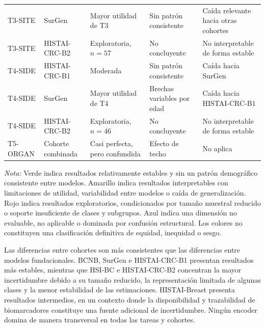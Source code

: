 \begin{table}[htbp]
{\begin{tabular}{l l p{3.2cm} p{3.6cm} p{3.4cm}}
T3-SITE &
SurGen &
\cellcolor{green!20}Mayor utilidad de T3 &
\cellcolor{green!20}Sin patrón consistente &
\cellcolor{yellow!25}Caída relevante hacia otras cohortes \\

T3-SITE &
HISTAI-CRC-B2 &
\cellcolor{red!25}Exploratoria, $n=57$ &
\cellcolor{red!25}No concluyente &
\cellcolor{red!25}No interpretable de forma estable \\
\midrule

T4-SIDE &
HISTAI-CRC-B1 &
\cellcolor{yellow!25}Moderada &
\cellcolor{green!20}Sin patrón consistente &
\cellcolor{yellow!25}Caída hacia SurGen \\

T4-SIDE &
SurGen &
\cellcolor{green!20}Mayor utilidad de T4 &
\cellcolor{yellow!25}Brechas variables por edad &
\cellcolor{yellow!25}Caída hacia HISTAI-CRC-B1 \\

T4-SIDE &
HISTAI-CRC-B2 &
\cellcolor{red!25}Exploratoria, $n=46$ &
\cellcolor{red!25}No concluyente &
\cellcolor{red!25}No interpretable de forma estable \\
\midrule

T5-ORGAN &
Cohorte combinada &
\cellcolor{blue!20}Casi perfecta, pero confundida &
\cellcolor{blue!20}Efecto de techo &
\cellcolor{blue!20}No aplica \\
\bottomrule
\end{tabular}%
}

\medskip
\footnotesize
\parbox{0.97\textwidth}{\textit{Nota:} Verde indica resultados relativamente estables y sin un patrón demográfico consistente entre modelos. Amarillo indica resultados interpretables con limitaciones de utilidad, variabilidad entre modelos o caída de generalización. Rojo indica resultados exploratorios, condicionados por tamaño muestral reducido o soporte insuficiente de clases y subgrupos. Azul indica una dimensión no evaluable, no aplicable o dominada por confusión estructural. Los colores no constituyen una clasificación definitiva de equidad, inequidad o sesgo.}
\end{table}

Las diferencias entre cohortes son más consistentes que las diferencias entre modelos fundacionales. BCNB, SurGen e HISTAI-CRC-B1 presentan resultados más estables, mientras que HSI-BC e HISTAI-CRC-B2 concentran la mayor incertidumbre debido a su tamaño reducido, la representación limitada de algunas clases y la menor estabilidad de las estimaciones. HISTAI-Breast presenta resultados intermedios, en un contexto donde la disponibilidad y trazabilidad de biomarcadores constituye una fuente adicional de incertidumbre. Ningún encoder domina de manera transversal en todas las tareas y cohortes.

